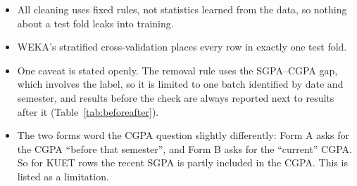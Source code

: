 \documentclass[11pt,a4paper]{article}
\begin{document}
\begin{itemize}
\begin{itemize}
  \item All cleaning uses fixed rules, not statistics learned from the data, so nothing about a test fold leaks into training.
  \item WEKA's stratified cross-validation places every row in exactly one test fold.
  \item One caveat is stated openly. The removal rule uses the SGPA--CGPA gap, which involves the label, so it is limited to one batch identified by date and semester, and results before the check are always reported next to results after it (Table~\ref{tab:beforeafter}).
  \item The two forms word the CGPA question slightly differently: Form A asks for the CGPA ``before that semester'', and Form B asks for the ``current'' CGPA. So for KUET rows the recent SGPA is partly included in the CGPA. This is listed as a limitation.
  \end{itemize}
\end{itemize}

\end{document}
